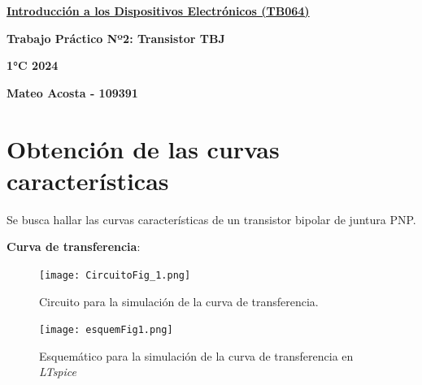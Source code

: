 \documentclass[10pt]{article}
\begin{document}
    
\begin{center}
    \underline{\textbf{\Large Introducción a los Dispositivos Electrónicos (TB064)}}
    
    \vspace{0.5\baselineskip}
    
    \textbf{\Large Trabajo Práctico Nº2: Transistor TBJ}
    
    \vspace{0.5\baselineskip}
    
    \textbf{\large 1°C 2024} 

    \vspace{0.5\baselineskip}
    
    \textbf{\large Mateo Acosta - 109391} 
\end{center}








\section{Obtención de las curvas características}

Se busca hallar las curvas características de un transistor bipolar de juntura PNP.

\textbf{Curva de transferencia}:

\setlength{\columnsep}{2cm} %

\begin{multicols}{2}
    \noindent    
    \begin{figure}[H]
        \centering
        \texttt{[image: CircuitoFig\_1.png]}
        \caption{Circuito para la simulación de la curva de transferencia.}
        \label{fig:circuito1}
    \end{figure}

    \columnbreak
    
    \begin{figure}[H]
        \centering
        \texttt{[image: esquemFig1.png]}
        \caption{Esquemático para la simulación de la curva de transferencia en \textit{LTspice}}
        \label{fig:circuito1_Spice}
    \end{figure}
\end{multicols}
\end{document}
